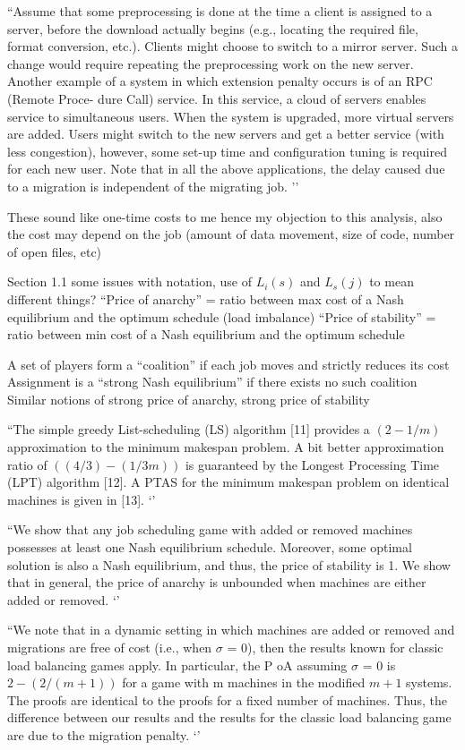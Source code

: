 \documentclass{article}
\begin{document}
``Assume that some preprocessing is done at the time a client is assigned to a server, before the download actually begins (e.g., locating the required file, format conversion, etc.). Clients might choose to switch to a mirror server. Such a change would require repeating the preprocessing work on the new server.   Another example of a system in which extension penalty occurs is of an RPC (Remote Proce- dure Call) service. In this service, a cloud of servers enables service to simultaneous users. When the system is upgraded, more virtual servers are added. Users might switch to the new servers and get a better service (with less congestion), however, some set-up time and configuration tuning is required for each new user.  Note that in all the above applications, the delay caused due to a migration is independent of the migrating job. 
’’

These sound like one-time costs to me hence my objection to this analysis, also the cost may depend on the job (amount of data movement, size of code, number of open files, etc)

Section 1.1 some issues with notation, use of $L_i(s)$ and $L_s(j)$ to mean different things?
“Price of anarchy” = ratio between max cost of a Nash equilibrium and the optimum schedule (load imbalance)
“Price of stability” = ratio between min cost of a Nash equilibrium and the optimum schedule

A set of players form a “coalition” if each job moves and strictly reduces its cost
Assignment is a “strong Nash equilibrium” if there exists no such coalition
Similar notions of strong price of anarchy, strong price of stability

``The simple greedy List-scheduling (LS) algorithm [11] provides a $(2 - 1/m)$approximation to the minimum makespan problem. A bit better approximation ratio of  $((4/3) - (1/3m))$ is guaranteed by the Longest Processing Time (LPT) algorithm [12]. A PTAS for the minimum makespan problem on identical machines is given in [13]. ‘’

``We show that any job scheduling game with added or removed machines possesses at least one Nash equilibrium schedule. Moreover, some optimal solution is also a Nash equilibrium, and thus, the price of stability is 1. We show that in general, the price of anarchy is unbounded when machines are either added or removed. ‘’

``We note that in a dynamic setting in which machines are added or removed and migrations 
are free of cost (i.e., when $\sigma$ = 0), then the results known for classic load balancing games apply.   In particular, the P oA assuming $\sigma$ = 0 is $2 - (2 / (m+1))$ for a game with m machines in the modified $m+1$  systems. The proofs are identical to the proofs for a fixed number of machines. Thus, the difference between our results and the results for the classic load balancing game are due to the migration penalty. ‘’
\end{document}
